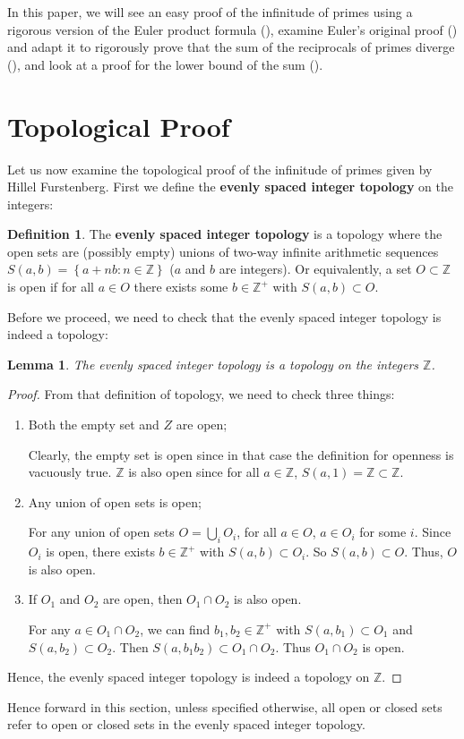 \documentclass[a4paper]{article}
\newtheorem{lemma}[theorem]{Lemma}
\theoremstyle{definition}
\newtheorem{definition}{Definition}[section]
\theoremstyle{remark}
\begin{document}
In this paper, we will see an easy proof of the infinitude of primes using a rigorous version of the Euler product formula (), examine Euler's original proof () and adapt it to rigorously prove that the sum of the reciprocals of primes diverge (), and look at a proof for the lower bound of the sum ().
\section{Topological Proof}
\label{sec:topological}
Let us now examine the topological proof of the infinitude of primes given by Hillel Furstenberg.
First we define the \textbf{evenly spaced integer topology} on the integers:
\begin{definition}
  The \textbf{evenly spaced integer topology} is a topology where the open sets are (possibly empty) unions of two-way infinite arithmetic sequences $S(a,b)=\left\{ a+nb:n\in\mathbb{Z} \right\}$ ($a$ and $b$ are integers). Or equivalently, a set $O\subset\mathbb{Z}$ is open if for all $a\in O$ there exists some $b\in\mathbb{Z^+}$ with $S(a,b)\subset O$.
  \label{def:esip}
\end{definition}
Before we proceed, we need to check that the evenly spaced integer topology is indeed a topology:
\begin{lemma}
  The evenly spaced integer topology is a topology on the integers $\mathbb{Z}$.
  \label{lem:esip}
\end{lemma}
\begin{proof}
  From that definition of topology, we need to check three things:
  \begin{enumerate}
    \item Both the empty set and $Z$ are open;

      Clearly, the empty set is open since in that case the definition for openness is vacuously true. $\mathbb{Z}$ is also open since for all $a\in\mathbb{Z}$, $S(a,1)=\mathbb{Z}\subset\mathbb{Z}$.
    \item Any union of open sets is open;

      For any union of open sets $O=\bigcup\limits_i O_i$, for all $a\in O$, $a\in O_i$ for some $i$. Since $O_i$ is open, there exists $b\in\mathbb{Z^+}$ with $S(a,b)\subset O_i$. So $S(a,b)\subset O$. Thus, $O$ is also open.
    \item If $O_1$ and $O_2$ are open, then $O_1\cap O_2$ is also open.

      For any $a\in O_1\cap O_2$, we can find $b_1,b_2\in\mathbb{Z^+}$ with $S(a,b_1)\subset O_1$ and $S(a,b_2)\subset O_2$. Then $S(a,b_1b_2)\subset O_1\cap O_2$. Thus $O_1\cap O_2$ is open.

  \end{enumerate}
  Hence, the evenly spaced integer topology is indeed a topology on $\mathbb{Z}$.
\end{proof}
Hence forward in this section, unless specified otherwise, all open or closed sets refer to open or closed sets in the evenly spaced integer topology.
\end{document}
